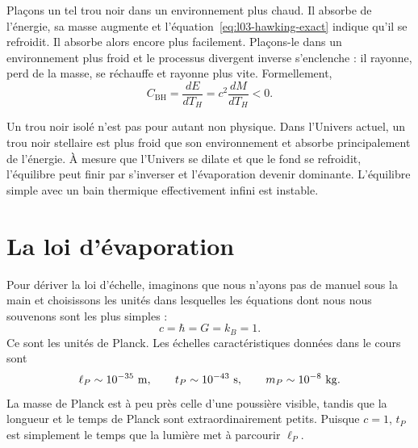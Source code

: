 Plaçons un tel trou noir dans un environnement plus chaud. Il absorbe de l’énergie, sa masse augmente et l’équation~\eqref{eq:l03-hawking-exact} indique qu’il se refroidit. Il absorbe alors encore plus facilement. Plaçons-le dans un environnement plus froid et le processus divergent inverse s’enclenche : il rayonne, perd de la masse, se réchauffe et rayonne plus vite. Formellement,
\begin{equation}
C_{\mathrm{BH}}
=\frac{dE}{dT_H}
=c^2\frac{dM}{dT_H}
<0.
\end{equation}

\begin{classroomqa}
\end{classroomqa}

Un trou noir isolé n’est pas pour autant non physique. Dans l’Univers actuel, un trou noir stellaire est plus froid que son environnement et absorbe principalement de l’énergie. À mesure que l’Univers se dilate et que le fond se refroidit, l’équilibre peut finir par s’inverser et l’évaporation devenir dominante. L’équilibre simple avec un bain thermique effectivement infini est instable.

\section{La loi d’évaporation}

Pour dériver la loi d’échelle, imaginons que nous n’ayons pas de manuel sous la main et choisissons les unités dans lesquelles les équations dont nous nous souvenons sont les plus simples :
\begin{equation}
c=\hbar=G=k_B=1.
\end{equation}
Ce sont les unités de Planck. Les échelles caractéristiques données dans le cours sont
\begin{equation}
\ell_P\sim10^{-35}\ {\rm m},
\qquad
t_P\sim10^{-43}\ {\rm s},
\qquad
m_P\sim10^{-8}\ {\rm kg}.
\end{equation}
La masse de Planck est à peu près celle d’une poussière visible, tandis que la longueur et le temps de Planck sont extraordinairement petits. Puisque \(c=1\), \(t_P\) est simplement le temps que la lumière met à parcourir \(\ell_P\).

